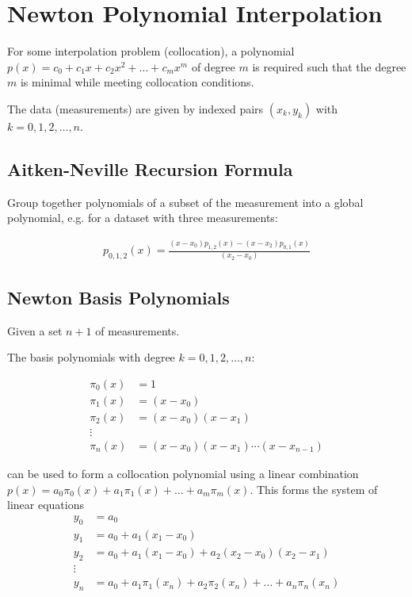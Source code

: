 \section{Newton Polynomial Interpolation}

For some interpolation problem (collocation), a polynomial
$p(x) = c_0 + c_1x + c_2x^2 + \ldots + c_mx^m$
of degree $m$ is required such that the degree $m$ is minimal while meeting collocation conditions.

The data (measurements) are given by indexed pairs $(x_k,y_k)$ with $k=0,1,2,\ldots,n$.

\subsection{Aitken-Neville Recursion Formula}

Group together polynomials of a subset of the measurement into a global polynomial, e.g. for a dataset with three measurements:

\begin{align*}
    p_{0,1,2}(x)=\frac{(x-x_0)p_{1,2}(x) - (x-x_2)p_{0,1}(x)}{(x_2-x_0)}
\end{align*}

\subsection{Newton Basis Polynomials}
Given a set $n+1$ of measurements.

The basis polynomials with degree $k=0,1,2,\ldots,n$:

\begin{snugshade*}
    \begin{align*}
        \pi_0(x) & = 1 \\
        \pi_1(x) & = (x-x_0) \\
        \pi_2(x) & = (x-x_0)(x-x_1) \\
        \vdots \\
        \pi_n(x) & = (x-x_0)(x-x_1)\cdots(x-x_{n-1})
    \end{align*}
\end{snugshade*}

can be used to form a collocation polynomial using a linear combination
$p(x)=a_0\pi_0(x) + a_1\pi_1(x) + \ldots + a_m\pi_m(x)$.
This forms the system of linear equations
\begin{align*}
    y_0 & = a_0 \\
    y_1 & = a_0 + a_1(x_1-x_0) \\
    y_2 & = a_0 + a_1(x_1-x_0) + a_2(x_2-x_0)(x_2-x_1) \\
    \vdots \\
    y_n & = a_0+a_1\pi_1(x_n)+a_2\pi_2(x_n)+\ldots+a_n\pi_n(x_n)
\end{align*}

